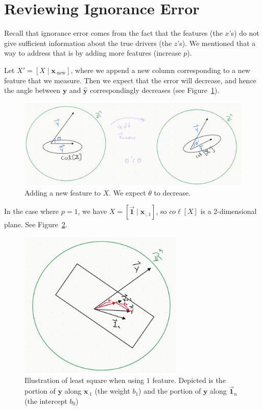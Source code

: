 \documentclass[12pt, a4paper]{article}
\theoremstyle{definition}
\begin{document}
	\section*{Reviewing Ignorance Error}
	Recall that ignorance error comes from the fact that the features (the $x$'s) do not give
	sufficient information about the true drivers (the $z$'s). We mentioned that a way to
	address that is by adding more features (increase $p$).
	
	Let $X'=[X \mid \mathbf{x}_{\cdot \text{new}}]$, where we append a new column
	corresponding to a new feature that we measure. Then we expect that the error
	will decrease, and hence the angle between $\mathbf{y}$ and $\hat{\mathbf{y}}$
	correspondingly decreases (see Figure~\ref{fig:add-new-feature}).
	\begin{figure}
		\centering
		\includegraphics[width=1.0\textwidth]{adding-new-feature}
		\caption{Adding a new feature to $X$. We expect $\theta$ to decrease.}
		\label{fig:add-new-feature}
	\end{figure}
	In the case where $p=1$, we have $X=[\vec{\mathbf{1}} \mid \mathbf{x}_{\cdot, 1}]$,
	so $co\ell[X]$ is a 2-dimensional plane. See Figure~\ref{fig:one-feature}.
	\begin{figure}
		\centering
		\includegraphics[width=0.7\textwidth]{one-feature}
		\caption{Illustration of least square when using $1$ feature.
		Depicted is the portion of $\mathbf{y}$ along $\mathbf{x}_{\cdot 1}$
		(the weight $b_1$) and the portion of $\mathbf{y}$ along $\vec{\mathbf{1}}_n$
		(the intercept $b_0$)}
		\label{fig:one-feature}
	\end{figure}
\end{document}
